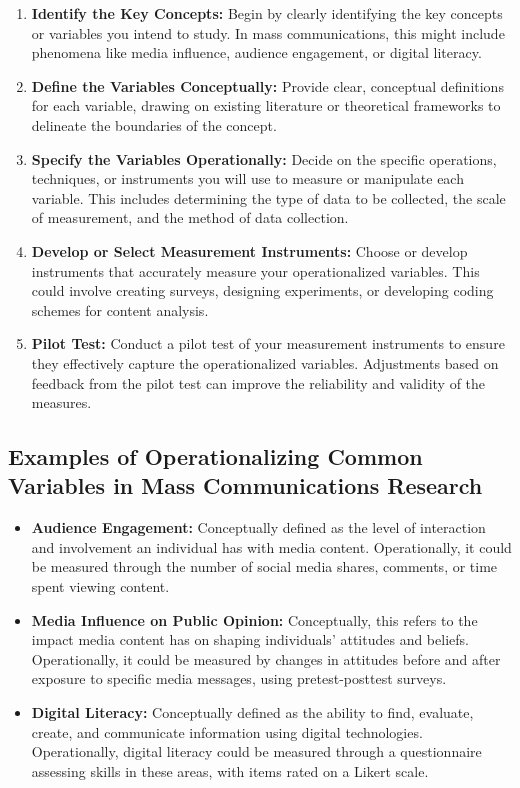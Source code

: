 \documentclass[
]{book}
\begin{document}
\begin{enumerate}
\def\labelenumi{\arabic{enumi}.}
\item
  \textbf{Identify the Key Concepts:} Begin by clearly identifying the key concepts or variables you intend to study. In mass communications, this might include phenomena like media influence, audience engagement, or digital literacy.
\item
  \textbf{Define the Variables Conceptually:} Provide clear, conceptual definitions for each variable, drawing on existing literature or theoretical frameworks to delineate the boundaries of the concept.
\item
  \textbf{Specify the Variables Operationally:} Decide on the specific operations, techniques, or instruments you will use to measure or manipulate each variable. This includes determining the type of data to be collected, the scale of measurement, and the method of data collection.
\item
  \textbf{Develop or Select Measurement Instruments:} Choose or develop instruments that accurately measure your operationalized variables. This could involve creating surveys, designing experiments, or developing coding schemes for content analysis.
\item
  \textbf{Pilot Test:} Conduct a pilot test of your measurement instruments to ensure they effectively capture the operationalized variables. Adjustments based on feedback from the pilot test can improve the reliability and validity of the measures.
\end{enumerate}

\hypertarget{examples-of-operationalizing-common-variables-in-mass-communications-research}{%
\subsection*{Examples of Operationalizing Common Variables in Mass Communications Research}\label{examples-of-operationalizing-common-variables-in-mass-communications-research}}

\begin{itemize}
\item
  \textbf{Audience Engagement:} Conceptually defined as the level of interaction and involvement an individual has with media content. Operationally, it could be measured through the number of social media shares, comments, or time spent viewing content.
\item
  \textbf{Media Influence on Public Opinion:} Conceptually, this refers to the impact media content has on shaping individuals' attitudes and beliefs. Operationally, it could be measured by changes in attitudes before and after exposure to specific media messages, using pretest-posttest surveys.
\item
  \textbf{Digital Literacy:} Conceptually defined as the ability to find, evaluate, create, and communicate information using digital technologies. Operationally, digital literacy could be measured through a questionnaire assessing skills in these areas, with items rated on a Likert scale.
\end{itemize}
\end{document}
